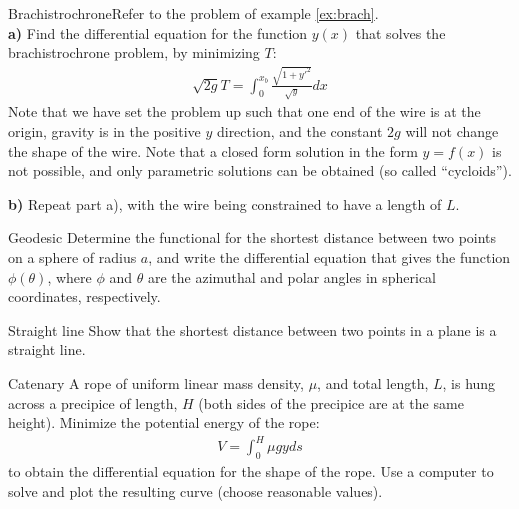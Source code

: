 \begin{problem}{Brachistrochrone}\label{prob_CalcVar_5}Refer to the problem of example \ref{ex:brach}.\\
\textbf{a)} Find the differential equation for the function $y(x)$ that solves the brachistrochrone problem, by minimizing $T$:
\begin{align*}
\sqrt{2g}T=\int_0^{x_b} \frac{\sqrt{1+y'^2}}{\sqrt{y}}dx
\end{align*}
Note that we have set the problem up such that one end of the wire is at the origin, gravity is in the positive $y$ direction, and the constant $2g$ will not change the shape of the wire. Note that a closed form solution in the form $y=f(x)$ is not possible, and only parametric solutions can be obtained (so called ``cycloids'').

\textbf{b)} Repeat part a), with the wire being constrained to have a length of $L$.
\end{problem}

\begin{problem}{Geodesic}\label{prob_CalcVar_6} Determine the functional for the shortest distance between two points on a sphere of radius $a$, and write the differential equation that gives the function $\phi(\theta)$, where $\phi$ and $\theta$ are the azimuthal and polar angles in spherical coordinates, respectively.
\end{problem}

\begin{problem}{Straight line}\label{prob_CalcVar_7} Show that the shortest distance between two points in a plane is a straight line.
\end{problem}

\begin{problem}{Catenary}\label{prob_CalcVar_8} A rope of uniform linear mass density, $\mu$, and total length, $L$, is hung across a precipice of length, $H$ (both sides of the precipice are at the same height). Minimize the potential energy of the rope:
\begin{align*}
V=\int_0^H \mu g y ds
\end{align*} 
to obtain the differential equation for the shape of the rope. Use a computer to solve and plot the resulting curve (choose reasonable values).
\end{problem}

